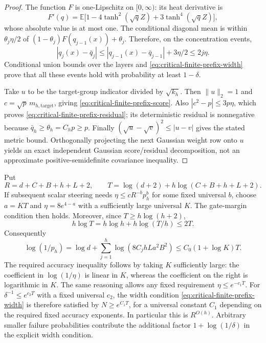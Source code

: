 \begin{proof}
The function $F$ is one-Lipschitz on $[0,\infty)$: its heat derivative
is
\[
 F'(q)=\mathbb E\bigl[1-4\tanh^2(\sqrt qZ)
                              +3\tanh^4(\sqrt qZ)\bigr],
\]
whose absolute value is at most one.  The conditional diagonal mean
is within $\theta_j\eta/2$ of
$(1-\theta_j)F(q_{j-1}(x))+\theta_j$.  Therefore, on the
concentration events,
\[
 |q_j(x)-\bar q_j|
 \le |q_{j-1}(x)-\bar q_{j-1}|+3\eta/2\le2j\eta.
\]
Conditional union bounds over the layers and
\eqref{eq:critical-finite-prefix-width} prove that all these events
hold with probability at least $1-\delta$.

Take $u$ to be the target-group indicator divided by $\sqrt{k_h}$.
Then $\|u\|_2=1$ and $c=\sqrt p\,m_{h,\mathrm{target}}$, giving
\eqref{eq:critical-finite-prefix-score}.  Also
$|c^2-p|\le3p\eta$, which proves
\eqref{eq:critical-finite-prefix-residual}; its deterministic residual
is nonnegative because $\bar q_h\ge\theta_h=C_hp\ge p$.
Finally $(\sqrt u-\sqrt v)^2\le|u-v|$ gives the stated metric
bound.  Orthogonally projecting the next Gaussian weight row onto $u$
yields an exact independent Gaussian score/residual decomposition,
not an approximate positive-semidefinite covariance inequality.
\end{proof}

\begin{remark}
\label{rem:critical-finite-prefix-accuracy}
Put
\[
 R=d+C+B+h+L+2,\qquad
 T=\log(d+2)+h\log(C+B+h+L+2).
\]
If subsequent scalar steering needs $\eta\le cR^{-b}p_h^b$ for
some fixed universal $b$, choose $a=KT$ and $\eta=8e^{4-a}$ with
a sufficiently large universal $K$.  The gate-margin condition then
holds.  Moreover, since $T\ge h\log(h+2)$,
\[
 h\log T=h\log h+h\log(T/h)\le2T.
\]
Consequently
\[
 \log(1/p_h)=\log d+
       \sum_{j=1}^h\log(8C_jhLa^2B^2)
       \le C_0(1+\log K)T.
\]
The required accuracy inequality follows by taking $K$ sufficiently
large: the coefficient in $\log(1/\eta)$ is linear in $K$, whereas
the coefficient on the right is logarithmic in $K$.  The same reasoning
allows any fixed requirement $\eta\le e^{-c_1T}$.
For $\delta^{-1}\le e^{c_2T}$ with a fixed universal $c_2$, the
width condition \eqref{eq:critical-finite-prefix-width} is therefore
satisfied by $N\ge e^{C_1T}$, for a universal constant $C_1$ depending
on the required fixed accuracy exponents.  In particular this is
$R^{O(h)}$.  Arbitrary smaller failure probabilities contribute the
additional factor $1+\log(1/\delta)$ in the explicit width condition.
\end{remark}
